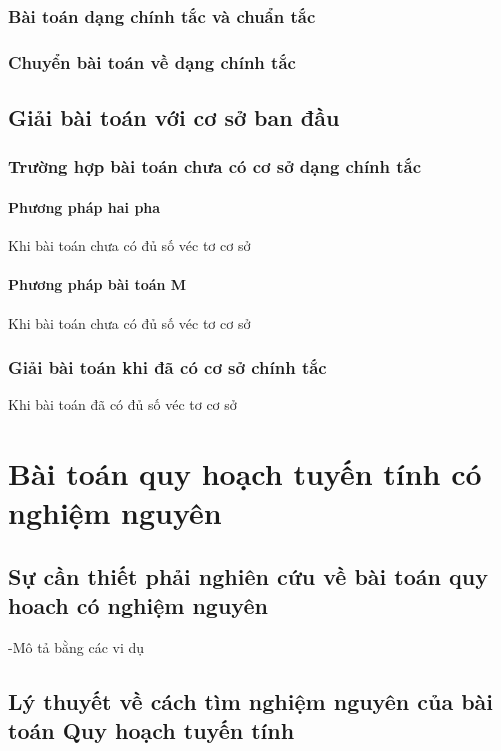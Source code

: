 \documentclass[12pt,a4paper]{report}
\begin{document}
\subsection{Bài toán dạng chính tắc và chuẩn tắc}

\subsection{Chuyển bài toán về dạng chính tắc}

\section{Giải bài toán với cơ sở ban đầu}

\subsection{Trường hợp bài toán chưa có cơ sở dạng chính tắc}

\subsubsection{Phương pháp hai pha}
Khi bài toán chưa có đủ số véc tơ cơ sở

\subsubsection{Phương pháp bài toán M}
Khi bài toán chưa có đủ số véc tơ cơ sở

\subsection{Giải bài toán khi đã có cơ sở chính tắc}
Khi bài toán đã có đủ số véc tơ cơ sở


\chapter{Bài toán quy hoạch tuyến tính có nghiệm nguyên}


\section{Sự cần thiết phải nghiên cứu về bài toán quy hoach có nghiệm nguyên}

-Mô tả bằng các vi dụ

\section{Lý thuyết về cách tìm nghiệm nguyên của bài toán Quy hoạch tuyến tính}
\end{document}
